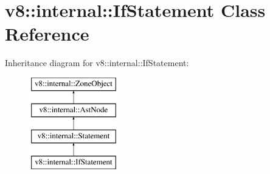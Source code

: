 \hypertarget{classv8_1_1internal_1_1IfStatement}{}\section{v8\+:\+:internal\+:\+:If\+Statement Class Reference}
\label{classv8_1_1internal_1_1IfStatement}
Inheritance diagram for v8\+:\+:internal\+:\+:If\+Statement\+:\begin{figure}[H]
\begin{center}
\leavevmode
\includegraphics[height=4.000000cm]{classv8_1_1internal_1_1IfStatement}
\end{center}
\end{figure}
